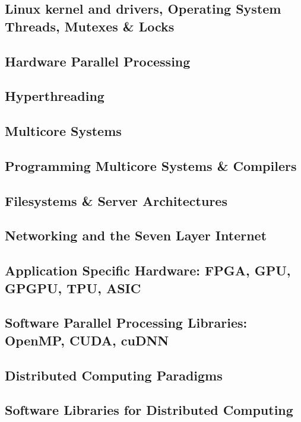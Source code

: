 \subsection{Linux kernel and drivers, Operating System Threads, Mutexes \& Locks}

\subsection{Hardware Parallel Processing}

\subsection{Hyperthreading}

\subsection{Multicore Systems}

\subsection{Programming Multicore Systems \& Compilers}

\subsection{Filesystems \& Server Architectures}

\subsection{Networking and the Seven Layer Internet}

\subsection{Application Specific Hardware: FPGA, GPU, GPGPU, TPU, ASIC}

\subsection{Software Parallel Processing Libraries: OpenMP, CUDA, cuDNN}

\subsection{Distributed Computing Paradigms}

\subsection{Software Libraries for Distributed Computing}
